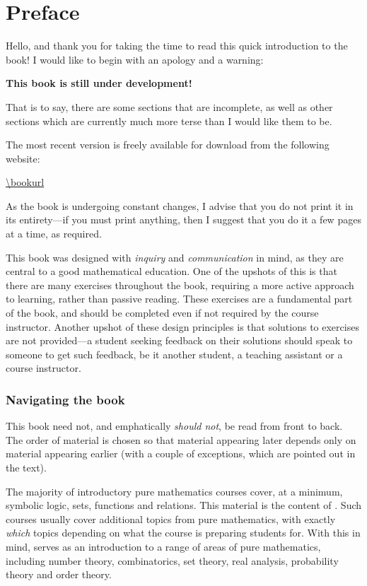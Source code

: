 \chapter*{Preface}

Hello, and thank you for taking the time to read this quick introduction to the book! I would like to begin with an apology and a warning:
\begin{center}
\Large \color{red} \bf This book is still under development!
\end{center}
That is to say, there are some sections that are incomplete, as well as other sections which are currently much more terse than I would like them to be.

The most recent version is freely available for download from the following website:
\begin{center}
\url{\bookurl}
\end{center}
As the book is undergoing constant changes, I advise that you do not print it in its entirety---if you must print anything, then I suggest that you do it a few pages at a time, as required.

This book was designed with \textit{inquiry} and \textit{communication} in mind, as they are central to a good mathematical education. One of the upshots of this is that there are many exercises throughout the book, requiring a more active approach to learning, rather than passive reading. These exercises are a fundamental part of the book, and should be completed even if not required by the course instructor. Another upshot of these design principles is that solutions to exercises are not provided---a student seeking feedback on their solutions should speak to someone to get such feedback, be it another student, a teaching assistant or a course instructor.

\subsection*{Navigating the book}

This book need not, and emphatically \textit{should not}, be read from front to back. The order of material is chosen so that material appearing later depends only on material appearing earlier (with a couple of exceptions, which are pointed out in the text).

The majority of introductory pure mathematics courses cover, at a minimum, symbolic logic, sets, functions and relations. This material is the content of . Such courses usually cover additional topics from pure mathematics, with exactly \textit{which} topics depending on what the course is preparing students for. With this in mind,  serves as an introduction to a range of areas of pure mathematics, including number theory, combinatorics, set theory, real analysis, probability theory and order theory.

